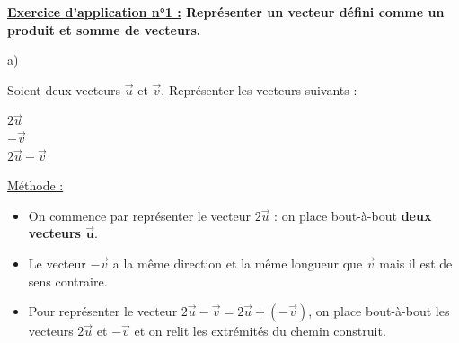 \documentclass[12pt]{article}
\begin{document}
\begin{mdframed}[
    linewidth=1pt,
    roundcorner=5pt,
    linecolor=RoyalBlue,
    innertopmargin=10pt,
    innerbottommargin=10pt
]
{\color{RoyalBlue}\textbf{\underline{Exercice d'application n°1 :} Représenter un vecteur
défini comme un produit et somme de vecteurs.}}
\vspace{10pt}

a)\vspace{5pt}\\
\begin{minipage}{.55\textwidth}%
\end{minipage}%
\hfill
\begin{minipage}{.45\textwidth}%
    Soient deux vecteurs $\overrightarrow{u}$ et $\overrightarrow{v}$. Représenter les 
    vecteurs suivants :
    \begin{center}
        $2\overrightarrow{u}$
        \vspace{5pt}\\
        $-\overrightarrow{v}$
        \vspace{5pt}\\
        $2\overrightarrow{u} - \overrightarrow{v}$
    \end{center}
\end{minipage}%

\vspace{10pt}
\underline{Méthode :}
\vspace{5pt}
\begin{itemize}
    \item On commence par représenter le vecteur $2\overrightarrow{u}$ : on place 
    bout-à-bout \textbf{deux vecteurs $\bm{\overrightarrow{u}}$}.
    \item Le vecteur $-\overrightarrow{v}$ a la même direction et la même longueur que 
    $\overrightarrow{v}$ mais il est de sens contraire.
    \item Pour représenter le vecteur $2\overrightarrow{u} - \overrightarrow{v} = 
    2\overrightarrow{u}+(-\overrightarrow{v})$, on place bout-à-bout les vecteurs 
    $2\overrightarrow{u}$ et $-\overrightarrow{v}$ et on relit les extrémités du chemin 
    construit.
\end{itemize}


\end{mdframed}
\end{document}
